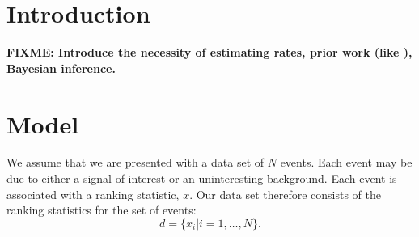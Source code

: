 \documentclass[aps,prd,reprint]{revtex4-1}
\newcommand{\fixme}[1]{\textbf{FIXME: #1}}
\begin{document}
\section{Introduction}

\fixme{Introduce the necessity of estimating rates, prior work (like
  \cite{Biswas2009}), Bayesian inference.}

\section{Model}

We assume that we are presented with a data set of $N$ events.  Each
event may be due to either a signal of interest or an uninteresting
background.  Each event is associated with a ranking statistic, $x$.
Our data set therefore consists of the ranking statistics for the set
of events:
\begin{equation}
  d = \{ x_i | i = 1, \ldots, N \}.
\end{equation}
\end{document}
